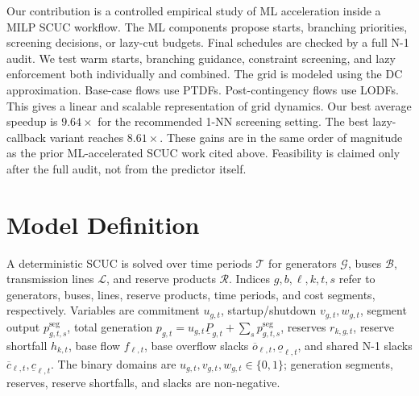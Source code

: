 \documentclass[runningheads]{llncs}
\begin{document}
Our contribution is a controlled empirical study of ML acceleration inside a MILP SCUC workflow. The ML components propose starts, branching priorities, screening decisions, or lazy-cut budgets. Final schedules are checked by a full N-1 audit. We test warm starts, branching guidance, constraint screening, and lazy enforcement both individually and combined. The grid is modeled using the DC approximation. Base-case flows use PTDFs. Post-contingency flows use LODFs. This gives a linear and scalable representation of grid dynamics. Our best average speedup is $9.64\times$ for the recommended 1-NN screening setting. The best lazy-callback variant reaches $8.61\times$. These gains are in the same order of magnitude as the prior ML-accelerated SCUC work cited above. Feasibility is claimed only after the full audit, not from the predictor itself.

\section{Model Definition}

A deterministic SCUC is solved over time periods $\mathcal{T}$ for generators $\mathcal{G}$, buses $\mathcal{B}$, transmission lines $\mathcal{L}$, and reserve products $\mathcal{R}$. Indices $g,b,\ell,k,t,s$ refer to generators, buses, lines, reserve products, time periods, and cost segments, respectively. Variables are commitment $u_{g,t}$, startup/shutdown $v_{g,t},w_{g,t}$, segment output $p^{\mathrm{seg}}_{g,t,s}$, total generation $p_{g,t}=u_{g,t}\underline{P}_{g,t}+\sum_s p^{\mathrm{seg}}_{g,t,s}$, reserves $r_{k,g,t}$, reserve shortfall $h_{k,t}$, base flow $f_{\ell,t}$, base overflow slacks $\overline{o}_{\ell,t},\underline{o}_{\ell,t}$, and shared N-1 slacks $\overline{c}_{\ell,t},\underline{c}_{\ell,t}$. The binary domains are $u_{g,t},v_{g,t},w_{g,t}\in\{0,1\}$; generation segments, reserves, reserve shortfalls, and slacks are non-negative.
\end{document}
